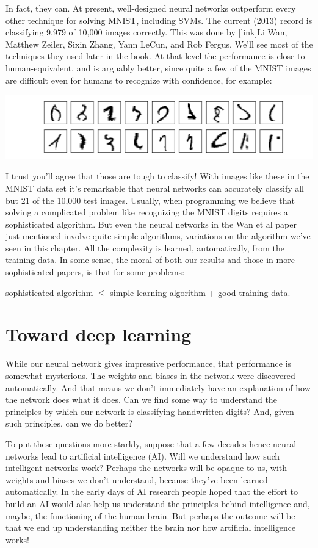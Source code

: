 \documentclass[a4paper,twoside,10pt]{book}
\begin{document}
In fact, they can. At present, well-designed neural networks outperform every other technique for solving MNIST, including SVMs. The current (2013) record is classifying 9,979 of 10,000 images correctly. This was done by [link]Li Wan, Matthew Zeiler, Sixin Zhang, Yann LeCun, and Rob Fergus. We'll see most of the techniques they used later in the book. At that level the performance is close to human-equivalent, and is arguably better, since quite a few of the MNIST images are difficult even for humans to recognize with confidence, for example:
\begin{center}
	\includegraphics[scale=0.35]{./figures/ch1/mnist_really_bad_images}
\end{center}

I trust you'll agree that those are tough to classify! With images like these in the MNIST data set it's remarkable that neural networks can accurately classify all but 21 of the 10,000 test images. Usually, when programming we believe that solving a complicated problem like recognizing the MNIST digits requires a sophisticated algorithm. But even the neural networks in the Wan et al paper just mentioned involve quite simple algorithms, variations on the algorithm we've seen in this chapter. All the complexity is learned, automatically, from the training data. In some sense, the moral of both our results and those in more sophisticated papers, is that for some problems:
\begin{center}
sophisticated algorithm $\le$ simple learning algorithm + good training data.
\end{center}
\section{Toward deep learning}
While our neural network gives impressive performance, that performance is somewhat mysterious. The weights and biases in the network were discovered automatically. And that means we don't immediately have an explanation of how the network does what it does. Can we find some way to understand the principles by which our network is classifying handwritten digits? And, given such principles, can we do better?

To put these questions more starkly, suppose that a few decades hence neural networks lead to artificial intelligence (AI). Will we understand how such intelligent networks work? Perhaps the networks will be opaque to us, with weights and biases we don't understand, because they've been learned automatically. In the early days of AI research people hoped that the effort to build an AI would also help us understand the principles behind intelligence and, maybe, the functioning of the human brain. But perhaps the outcome will be that we end up understanding neither the brain nor how artificial intelligence works!
\end{document}
